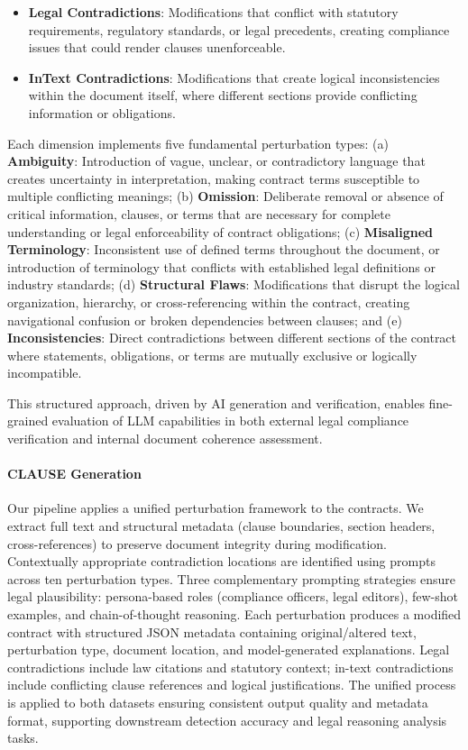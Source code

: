 \documentclass[11pt]{article}
\newcommand{\datasetName}{{\sc CLAUSE}\xspace}
\begin{document}
\begin{itemize}[leftmargin=*,itemsep=0.1em]
\item \textbf{Legal Contradictions}: Modifications that conflict with statutory requirements, regulatory standards, or legal precedents, creating compliance issues that could render clauses unenforceable.
\item \textbf{InText Contradictions}: Modifications that create logical inconsistencies within the document itself, where different sections provide conflicting information or obligations.
\end{itemize}
\vspace{-0.4em}
Each dimension implements five fundamental perturbation types: (a) \textbf{Ambiguity}: Introduction of vague, unclear, or contradictory language that creates uncertainty in interpretation, making contract terms susceptible to multiple conflicting meanings; (b) \textbf{Omission}: Deliberate removal or absence of critical information, clauses, or terms that are necessary for complete understanding or legal enforceability of contract obligations; (c) \textbf{Misaligned Terminology}: Inconsistent use of defined terms throughout the document, or introduction of terminology that conflicts with established legal definitions or industry standards; (d) \textbf{Structural Flaws}: Modifications that disrupt the logical organization, hierarchy, or cross-referencing within the contract, creating navigational confusion or broken dependencies between clauses; and (e) \textbf{Inconsistencies}: Direct contradictions between different sections of the contract where statements, obligations, or terms are mutually exclusive or logically incompatible.

This structured approach, driven by AI generation and verification, enables fine-grained evaluation of LLM capabilities in both external legal compliance verification and internal document coherence assessment.


\paragraph{\datasetName Generation}
Our pipeline applies a unified perturbation framework to the contracts. We extract full text and structural metadata (clause boundaries, section headers, cross-references) to preserve document integrity during modification. Contextually appropriate contradiction locations are identified using prompts across ten perturbation types. Three complementary prompting strategies ensure legal plausibility: persona-based roles (compliance officers, legal editors), few-shot examples, and chain-of-thought reasoning. Each perturbation produces a modified contract with structured JSON metadata containing original/altered text, perturbation type, document location, and model-generated explanations. Legal contradictions include law citations and statutory context; in-text contradictions include conflicting clause references and logical justifications. The unified process is applied to both datasets ensuring consistent output quality and metadata format, supporting downstream detection accuracy and legal reasoning analysis tasks.
\end{document}
